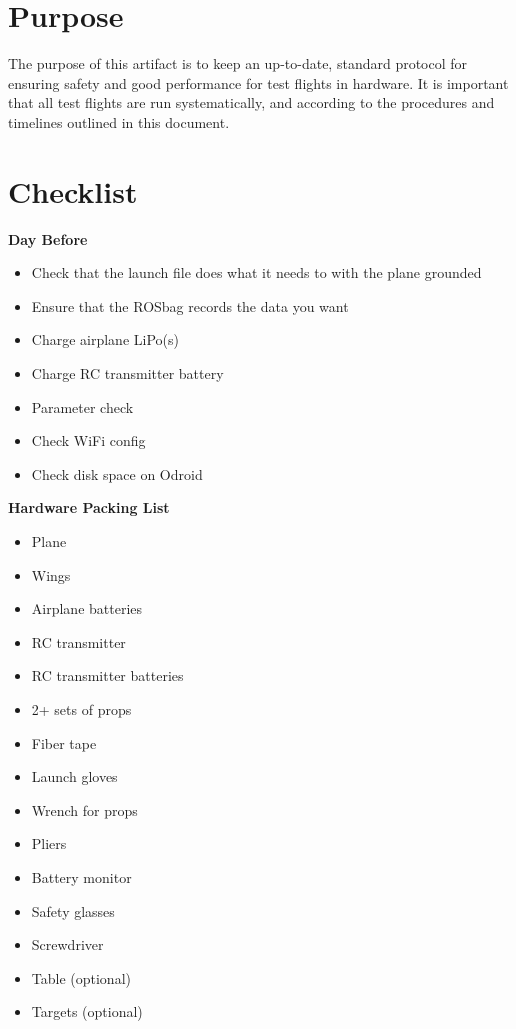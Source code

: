 \documentclass[]{auvsi_doc}
\begin{document}
\begin{AUVSITitlePage}
\begin{artifacttable}
\end{artifacttable}
\end{AUVSITitlePage}

\section{Purpose}

The purpose of this artifact is to keep an up-to-date, standard protocol for ensuring safety and good performance for test flights in hardware. It is important that all test flights are run systematically, and according to the procedures and timelines outlined in this document.

\section{Checklist}

\textbf{Day Before}
\begin{itemize}
	\item Check that the launch file does what it needs to with the plane grounded
	\item Ensure that the ROSbag records the data you want
	\item Charge airplane LiPo(s)
	\item Charge RC transmitter battery
	\item Parameter check
	\item Check WiFi config
	\item Check disk space on Odroid
\end{itemize}

\hrulefill

\textbf{Hardware Packing List}
\begin{itemize}
	\item Plane
	\item Wings
	\item Airplane batteries
	\item RC transmitter
	\item RC transmitter batteries
	\item 2+ sets of props
	\item Fiber tape
	\item Launch gloves
	\item Wrench for props
	\item Pliers
	\item Battery monitor
	\item Safety glasses
	\item Screwdriver
	\item Table (optional)
	\item Targets (optional)
\end{itemize}
\end{document}
